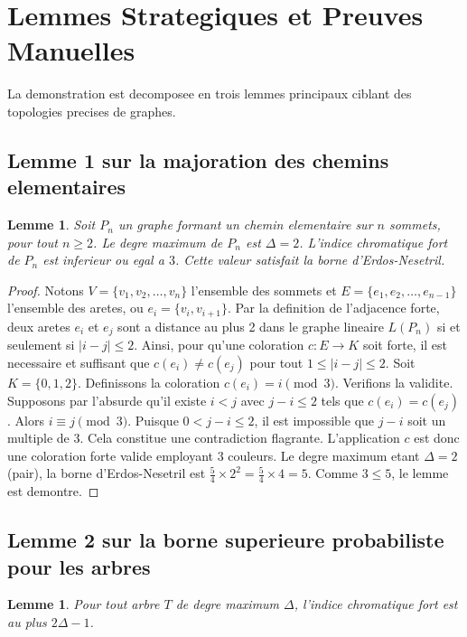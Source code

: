 \documentclass[11pt,a4paper]{article}
\newtheorem{lemma}[theorem]{Lemme}
\begin{document}
\section{Lemmes Strategiques et Preuves Manuelles}

La demonstration est decomposee en trois lemmes principaux ciblant des topologies precises de graphes.

\subsection{Lemme 1 sur la majoration des chemins elementaires}

\begin{lemma}
Soit $P_n$ un graphe formant un chemin elementaire sur $n$ sommets, pour tout $n \geq 2$. Le degre maximum de $P_n$ est $\Delta = 2$. L'indice chromatique fort de $P_n$ est inferieur ou egal a $3$. Cette valeur satisfait la borne d'Erdos-Nesetril.
\end{lemma}

\begin{proof}
Notons $V = \{v_1, v_2, \dots, v_n\}$ l'ensemble des sommets et $E = \{e_1, e_2, \dots, e_{n-1}\}$ l'ensemble des aretes, ou $e_i = \{v_i, v_{i+1}\}$. Par la definition de l'adjacence forte, deux aretes $e_i$ et $e_j$ sont a distance au plus 2 dans le graphe lineaire $L(P_n)$ si et seulement si $|i - j| \leq 2$. Ainsi, pour qu'une coloration $c : E \to K$ soit forte, il est necessaire et suffisant que $c(e_i) \neq c(e_j)$ pour tout $1 \leq |i - j| \leq 2$.
Soit $K = \{0, 1, 2\}$. Definissons la coloration $c(e_i) = i \pmod 3$.
Verifions la validite. Supposons par l'absurde qu'il existe $i < j$ avec $j - i \leq 2$ tels que $c(e_i) = c(e_j)$. Alors $i \equiv j \pmod 3$. Puisque $0 < j - i \leq 2$, il est impossible que $j - i$ soit un multiple de $3$. Cela constitue une contradiction flagrante. L'application $c$ est donc une coloration forte valide employant $3$ couleurs.
Le degre maximum etant $\Delta = 2$ (pair), la borne d'Erdos-Nesetril est $\frac{5}{4} \times 2^2 = \frac{5}{4} \times 4 = 5$. Comme $3 \leq 5$, le lemme est demontre.
\end{proof}

\subsection{Lemme 2 sur la borne superieure probabiliste pour les arbres}

\begin{lemma}
Pour tout arbre $T$ de degre maximum $\Delta$, l'indice chromatique fort est au plus $2\Delta - 1$.
\end{lemma}
\end{document}
